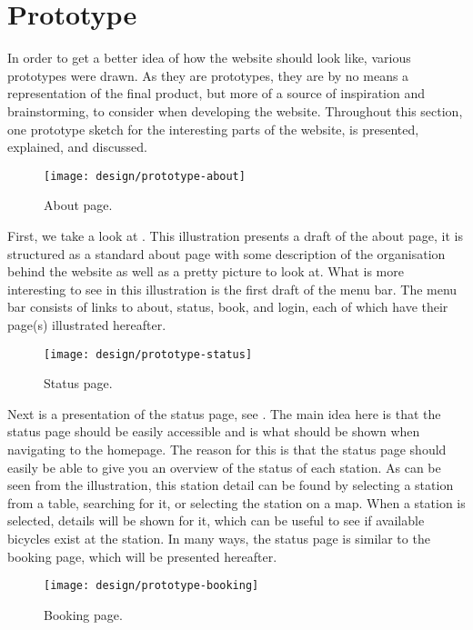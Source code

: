 \section{Prototype}
In order to get a better idea of how the website should look like, various prototypes were drawn.
As they are prototypes, they are by no means a representation of the final product, but more of a source of inspiration and brainstorming, to consider when developing the website.
Throughout this section, one prototype sketch for the interesting parts of the website, is presented, explained, and discussed.

\begin{figure}[h]
	\centering
	\texttt{[image: design/prototype-about]}
	\caption{About page.}\label{fig:prototype-about}
\end{figure}

First, we take a look at .
This illustration presents a draft of the about page, it is structured as a standard about page with some description of the organisation behind the website as well as a pretty picture to look at.
What is more interesting to see in this illustration is the first draft of the menu bar.
The menu bar consists of links to about, status, book, and login, each of which have their page(s) illustrated hereafter.

\begin{figure}[h]
	\centering
	\texttt{[image: design/prototype-status]}
	\caption{Status page.}\label{fig:prototype-status}
\end{figure}

Next is a presentation of the status page, see .
The main idea here is that the status page should be easily accessible and is what should be shown when navigating to the homepage.
The reason for this is that the status page should easily be able to give you an overview of the status of each station.
As can be seen from the illustration, this station detail can be found by selecting a station from a table, searching for it, or selecting the station on a map.
When a station is selected, details will be shown for it, which can be useful to see if available bicycles exist at the station.
In many ways, the status page is similar to the booking page, which will be presented hereafter.

\begin{figure}[h]
	\centering
	\texttt{[image: design/prototype-booking]}
	\caption{Booking page.}\label{fig:prototype-book}
\end{figure}

